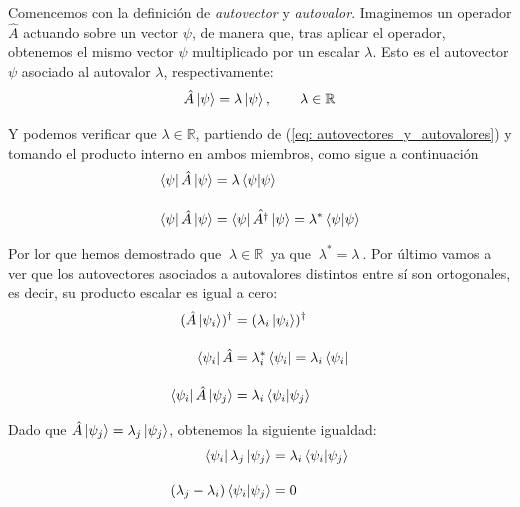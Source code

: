 \documentclass{article}
\numberwithin{equation}{section} %
\begin{document}
    \vspace{5mm}

    Comencemos con la definición de \textit{autovector} y \textit{autovalor}. Imaginemos un operador \( \hat{A} \) actuando sobre un vector \( \psi \), de manera que, tras aplicar el operador, obtenemos el mismo vector \( \psi \) multiplicado por un escalar \( \lambda \). Esto es el autovector \( \psi \) asociado al autovalor \( \lambda \), respectivamente:
    \begin{equation}
        \hat{A} \ket{\psi} = \lambda \ket{\psi}, \qquad \lambda \in \mathbb{R}
        \label{eq: autovectores_y_autovalores}
    \end{equation}

    \vspace{1.5mm}

    Y podemos verificar que \( \lambda \in \mathbb{R} \), partiendo de (\ref{eq: autovectores_y_autovalores}) y tomando el producto interno en ambos miembros, como sigue a continuación
    \begin{align*}
        \bra{\psi} \hat{A} \ket{\psi} &= \lambda \braket{\psi | \psi} \\[10pt]
        \bra{\psi} \hat{A} \ket{\psi} &= \bra{\psi} {\hat{A ^ {\dagger}}} \ket{\psi} = \lambda ^ {*} \braket{\psi | \psi} 
    \end{align*}

    \vspace{1.5mm}

    Por lor que hemos demostrado que \( \ \lambda \in \mathbb{R} \ \) ya que \( \ \lambda ^ {*} = \lambda \ \). Por último vamos a ver que los autovectores asociados a autovalores distintos entre sí son ortogonales, es decir, su producto escalar es igual a cero:
    \begin{align*}
        (\hat{A} \ket{\psi_{i}})^{\dagger} &= (\lambda_{i} \ket{\psi_{i}})^{\dagger} \\[10pt]
        \bra{\psi_{i}} \hat{A} &= \lambda_{i}^{*} \bra{\psi_{i}} = \lambda_{i} \bra{\psi_{i}} \\[10pt]
        \bra{\psi_{i}} \hat{A} \ket{\psi_{j}} &= \lambda_{i} \braket{\psi_{i} | \psi_{j}}
    \end{align*}

    \vspace{1.5mm}

    Dado que \( \hat{A} \ket{\psi_{j}} = \lambda_{j} \ket{\psi_{j}} \), obtenemos la siguiente igualdad:
    \begin{align*}
        \bra{\psi_{i}} \lambda_{j} \ket{\psi_{j}} &= \lambda_{i} \braket{\psi_{i} | \psi_{j}} \\[10pt]
        ( \lambda_{j} - \lambda_{i} ) \braket{\psi_{i} | \psi_{j}} &= 0
    \end{align*}
\end{document}
